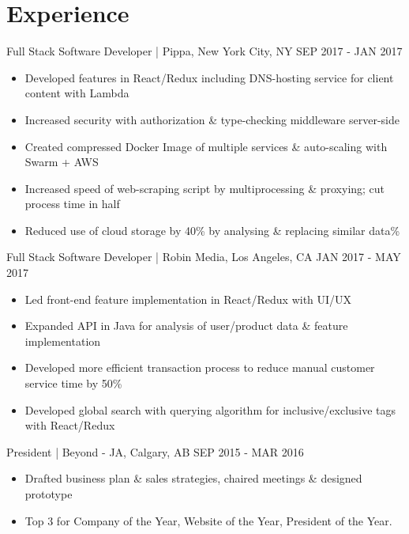 \documentclass[]{friggeri-cv}
\begin{document}
\section{Experience}

\begin{entrylist}
	\entry
	{Full Stack Software Developer | \normalfont Pippa, New York City, NY}
	{SEP 2017 - JAN 2017}
	{
		\begin{itemize}[leftmargin=*]
			\vspace{-0.3cm}
			\item Developed features in React/Redux including DNS-hosting service for client content with Lambda
			\item Increased security with authorization \& type-checking middleware server-side
			\item Created compressed Docker Image of multiple services \& auto-scaling with Swarm + AWS
			\item Increased speed of web-scraping script by multiprocessing \& proxying; cut process time in half
			\item Reduced use of cloud storage by 40\% by analysing \& replacing similar data\%  
		\end{itemize}
	}
	\entry
	{Full Stack Software Developer | \normalfont Robin Media, Los Angeles, CA}
	{JAN 2017 - MAY 2017}
	{
		\begin{itemize}[leftmargin=*]
			\vspace{-0.3cm}
			\item Led front-end feature implementation in React/Redux with UI/UX
			\item Expanded API in Java for analysis of user/product data \& feature implementation
			\item Developed more efficient transaction process to reduce manual customer service time by 50\%
			\item Developed global search with querying algorithm for inclusive/exclusive tags with React/Redux
		\end{itemize}
	}
	\entry
	{President | \normalfont Beyond - JA, Calgary, AB}
	{SEP 2015 - MAR 2016}
	{
		\begin{itemize}[leftmargin=*]
			\vspace{-0.3cm}
			\item Drafted business plan \& sales strategies, chaired meetings \& designed prototype
			\item Top 3 for Company of the Year, Website of the Year, President of the Year.
		\end{itemize}
	}
\end{entrylist}
\end{document}
